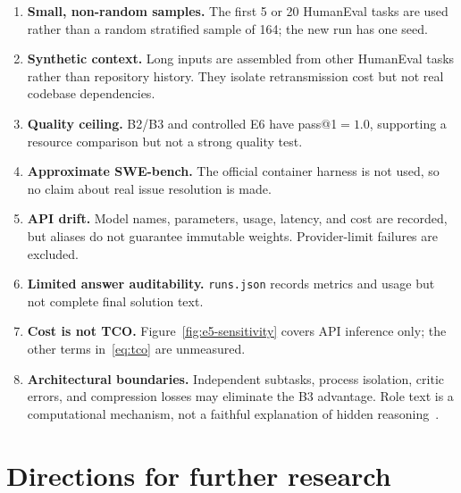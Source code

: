 \begin{enumerate}
\item \textbf{Small, non-random samples.} The first 5 or 20 HumanEval tasks are used rather than a random stratified sample of 164; the new run has one seed.
\item \textbf{Synthetic context.} Long inputs are assembled from other HumanEval tasks rather than repository history. They isolate retransmission cost but not real codebase dependencies.
\item \textbf{Quality ceiling.} B2/B3 and controlled E6 have pass@1${}=1.0$, supporting a resource comparison but not a strong quality test.
\item \textbf{Approximate SWE-bench.} The official container harness is not used, so no claim about real issue resolution is made.
\item \textbf{API drift.} Model names, parameters, usage, latency, and cost are recorded, but aliases do not guarantee immutable weights. Provider-limit failures are excluded.
\item \textbf{Limited answer auditability.} \textnormal{\texttt{runs.json}} records metrics and usage but not complete final solution text.
\item \textbf{Cost is not TCO.} Figure~\ref{fig:e5-sensitivity} covers API inference only; the other terms in~\eqref{eq:tco} are unmeasured.
\item \textbf{Architectural boundaries.} Independent subtasks, process isolation, critic errors, and compression losses may eliminate the B3 advantage. Role text is a computational mechanism, not a faithful explanation of hidden reasoning~\cite{turpin2023unfaithful}.
\end{enumerate}

\section{Directions for further research}\label{sec:agenda}

